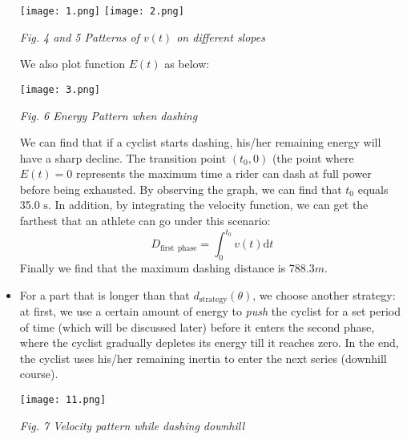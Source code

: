 \documentclass[14pt]{article}
\theoremstyle{definition}
\theoremstyle{remark}
\numberwithin{equation}{section}
\begin{document}
\begin{itemize}
			\begin{center}
				\texttt{[image: 1.png]}
				\texttt{[image: 2.png]}

				\small \textit{Fig. 4 and 5 Patterns of $v(t)$ on different slopes}
			\end{center}

			We also plot function \(E(t)\) as below:
			\begin{center}
				\texttt{[image: 3.png]}

				\small \textit{Fig. 6 Energy Pattern when dashing}
			\end{center}
			We can find that if a cyclist starts dashing, his/her remaining energy will have a sharp decline. The transition point \(\left(t_0,0\right)\) (the point where \(E(t) = 0\) represents the maximum time a rider can dash at full power before being exhausted. By observing the graph, we can find that \(t_0\) equals 35.0 $\mathrm{s}$. In addition, by integrating the velocity function, we can get the farthest that an athlete can go under this scenario:
			\[D_{\mathrm{first}\:\:\mathrm{phase}}=\int_0^{t_0}{v\left( t \right) \mathrm{d}t}\]
			Finally we find that the maximum dashing distance is 788.3$m$.

		\item For a part that is longer than that $d_{\mathrm{strategy}}\left(\theta\right)$, we choose another strategy: at first, we use a certain amount of energy to \textit{push} the cyclist for a set period of time (which will be discussed later) before it enters the second phase, where the cyclist gradually depletes its energy till it reaches zero. In the end, the cyclist uses his/her remaining inertia to enter the next series (downhill course).
			\begin{center}
				\texttt{[image: 11.png]}

				\small \textit{Fig. 7 Velocity pattern while dashing downhill}
			\end{center}

	\end{itemize}
\end{document}
